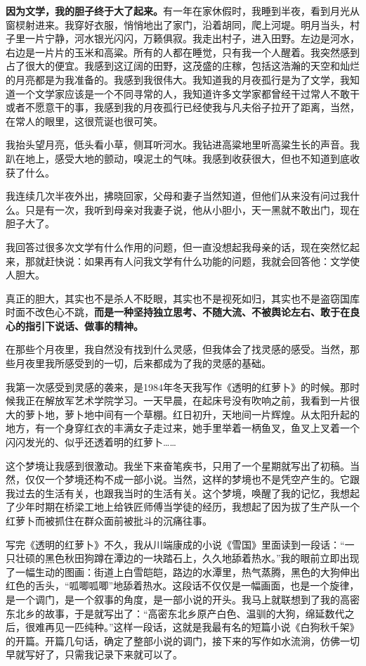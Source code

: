 \documentclass[12pt,a5paper]{ctexbook}
\begin{document}
\textbf{因为文学，我的胆子终于大了起来。}有一年在家休假时，我睡到半夜，看到月光从窗棂射进来。我穿好衣服，悄悄地出了家门，沿着胡同，爬上河堤。明月当头，村子里一片宁静，河水银光闪闪，万籁俱寂。我走出村子，进入田野。左边是河水，右边是一片片的玉米和高粱。所有的人都在睡觉，只有我一个人醒着。我突然感到占了很大的便宜。我感到这辽阔的田野，这茂盛的庄稼，包括这浩瀚的天空和灿烂的月亮都是为我准备的。我感到我很伟大。我知道我的月夜孤行是为了文学，我知道一个文学家应该是一个不同寻常的人，我知道许多文学家都曾经干过常人不敢干或者不愿意干的事，我感到我的月夜孤行已经使我与凡夫俗子拉开了距离，当然，在常人的眼里，这很荒诞也很可笑。

我抬头望月亮，低头看小草，侧耳听河水。我钻进高粱地里听高粱生长的声音。我趴在地上，感受大地的颤动，嗅泥土的气味。我感到收获很大，但也不知道到底收获了什么。

我连续几次半夜外出，拂晓回家，父母和妻子当然知道，但他们从来没有问过我什么。只是有一次，我听到母亲对我妻子说，他从小胆小，天一黑就不敢出门，现在胆子大了。

我回答过很多次文学有什么作用的问题，但一直没想起我母亲的话，现在突然忆起来，那就赶快说：如果再有人问我文学有什么功能的问题，我就会回答他：文学使人胆大。

真正的胆大，其实也不是杀人不眨眼，其实也不是视死如归，其实也不是盗窃国库时面不改色心不跳，\textbf{而是一种坚持独立思考、不随大流、不被舆论左右、敢于在良心的指引下说话、做事的精神。}

在那些个月夜里，我自然没有找到什么灵感，但我体会了找灵感的感受。当然，那些月夜里我所感受到的一切，后来都成为了我的灵感的基础。

我第一次感受到灵感的袭来，是1984年冬天我写作《透明的红萝卜》的时候。那时候我正在解放军艺术学院学习。一天早晨，在起床号没有吹响之前，我看到一片很大的萝卜地，萝卜地中间有一个草棚。红日初升，天地间一片辉煌。从太阳升起的地方，有一个身穿红衣的丰满女子走过来，她手里举着一柄鱼叉，鱼叉上叉着一个闪闪发光的、似乎还透着明的红萝卜……

这个梦境让我感到很激动。我坐下来奋笔疾书，只用了一个星期就写出了初稿。当然，仅仅一个梦境还构不成一部小说。当然，这样的梦境也不是凭空产生的。它跟我过去的生活有关，也跟我当时的生活有关。这个梦境，唤醒了我的记忆，我想起了少年时期在桥梁工地上给铁匠师傅当学徒的经历，我想起了因为拔了生产队一个红萝卜而被抓住在群众面前被批斗的沉痛往事。

写完《透明的红萝卜》不久，我从川端康成的小说《雪国》里面读到一段话：“一只壮硕的黑色秋田狗蹲在潭边的一块踏石上，久久地舔着热水。”我的眼前立即出现了一幅生动的图画：街道上白雪皑皑，路边的水潭里，热气蒸腾，黑色的大狗伸出红色的舌头，“呱唧呱唧”地舔着热水。这段话不仅仅是一幅画面，也是一个旋律，是一个调门，是一个叙事的角度，是一部小说的开头。我马上就联想到了我的高密东北乡的故事，于是就写出了：“高密东北乡原产白色、温驯的大狗，绵延数代之后，很难再见一匹纯种。”这样一段话，这就是我最有名的短篇小说《白狗秋千架》的开篇。开篇几句话，确定了整部小说的调门，接下来的写作如水流淌，仿佛一切早就写好了，只需我记录下来就可以了。
\end{document}
